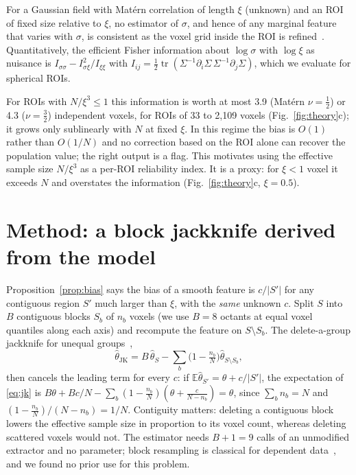 \documentclass[runningheads]{llncs}
\newcommand{\E}{\mathbb{E}}
\begin{document}
\begin{proposition}\label{prop:ident}
For a Gaussian field with Mat\'ern correlation of length $\xi$ (unknown) and an ROI of fixed size relative to $\xi$, no estimator of $\sigma$, and hence of any marginal feature that varies with $\sigma$, is consistent as the voxel grid inside the ROI is refined~\cite{zhang2004}. Quantitatively, the efficient Fisher information about $\log\sigma$ with $\log\xi$ as nuisance is $I_{\sigma\sigma}-I_{\sigma\xi}^2/I_{\xi\xi}$ with $I_{ij}=\tfrac12\operatorname{tr}(\Sigma^{-1}\partial_i\Sigma\,\Sigma^{-1}\partial_j\Sigma)$, which we evaluate for spherical ROIs.
\end{proposition}
\noindent For ROIs with $N/\xi^3\le1$ this information is worth at most 3.9 (Mat\'ern $\nu=\tfrac12$) or 4.3 ($\nu=\tfrac32$) independent voxels, for ROIs of 33 to 2{,}109 voxels (Fig.~\ref{fig:theory}c); it grows only sublinearly with $N$ at fixed $\xi$. In this regime the bias is $O(1)$ rather than $O(1/N)$ and no correction based on the ROI alone can recover the population value; the right output is a flag. This motivates using the effective sample size $N/\xi^3$ as a per-ROI reliability index. It is a proxy: for $\xi<1$ voxel it exceeds $N$ and overstates the information (Fig.~\ref{fig:theory}c, $\xi=0.5$).

\section{Method: a block jackknife derived from the model}\label{sec:method}
Proposition~\ref{prop:bias} says the bias of a smooth feature is $c/|S'|$ for any contiguous region $S'$ much larger than $\xi$, with the \emph{same} unknown $c$. Split $S$ into $B$ contiguous blocks $S_b$ of $n_b$ voxels (we use $B=8$ octants at equal voxel quantiles along each axis) and recompute the feature on $S\setminus S_b$. The delete-a-group jackknife for unequal groups~\cite{busing1999},
\begin{equation}
\hat\theta_{\mathrm{JK}}=B\,\hat\theta_S-\textstyle\sum_{b}\big(1-\tfrac{n_b}{N}\big)\hat\theta_{S\setminus S_b},\label{eq:jk}
\end{equation}
then cancels the leading term for every $c$: if $\E\hat\theta_{S'}=\theta+c/|S'|$, the expectation of \eqref{eq:jk} is $B\theta+Bc/N-\sum_b(1-\tfrac{n_b}{N})(\theta+\tfrac{c}{N-n_b})=\theta$, since $\sum_b n_b=N$ and $(1-\tfrac{n_b}{N})/(N-n_b)=1/N$. Contiguity matters: deleting a contiguous block lowers the effective sample size in proportion to its voxel count, whereas deleting scattered voxels would not. The estimator needs $B+1=9$ calls of an unmodified extractor and no parameter; block resampling is classical for dependent data~\cite{kunsch1989,lahiri2003}, and we found no prior use for this problem.
\end{document}
